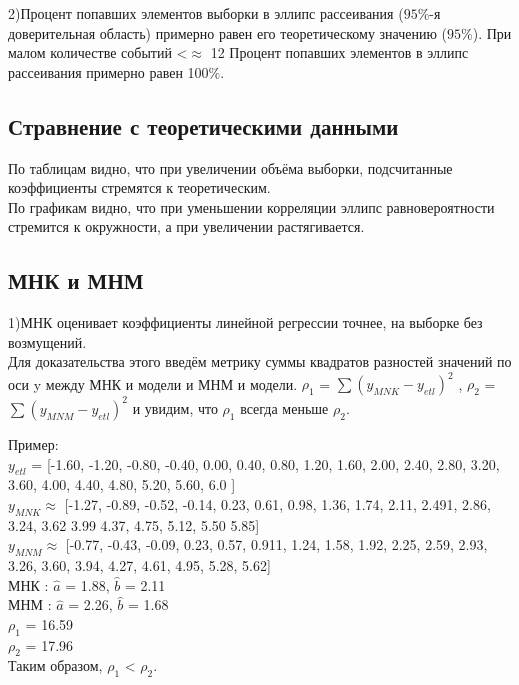 \documentclass[a4]{article}
\begin{document}
			2)Процент попавших элементов выборки в эллипс рассеивания ($95\%$-я доверительная область) примерно равен его теоретическому значению ($95\%$). При малом количестве событий <$\approx$ 12  Процент попавших элементов в эллипс рассеивания примерно равен 100$\%$.
		\subsection{Стравнение с теоретическими данными}
		По таблицам видно, что при увеличении объёма выборки, подсчитанные коэффициенты стремятся к теоретическим.\\
		По графикам видно, что при уменьшении корреляции эллипс равновероятности стремится к окружности, а при увеличении растягивается.
		\subsection{МНК и МНМ}
		1)МНК оценивает коэффициенты линейной регрессии точнее, на выборке без возмущений.\\
		Для доказательства этого введём метрику суммы квадратов разностей значений по оси y между МНК и модели и МНМ и модели. $\rho_1$ = $\sum (y_{MNK} - y_{etl})^2$ , $\rho_2$ = $\sum (y_{MNM} - y_{etl})^2$ и увидим, что $\rho_1$ всегда меньше $\rho_2$.\\ 
		\begin{center}
			Пример: \\
			$y_{etl}$ = [-1.60, -1.20, -0.80, -0.40,  0.00,   0.40,  0.80, 1.20,  1.60,  2.00,   2.40,  2.80,  3.20,  3.60, 4.00,  4.40,  4.80,  5.20,  5.60,  6.0 ]\\
			$y_{MNK} \approx $ [-1.27, -0.89, -0.52,  -0.14,  0.23,  0.61, 0.98,  1.36,  1.74,  2.11,  2.491,  2.86, 3.24,  3.62  3.99   4.37,  4.75, 5.12, 5.50  5.85]\\
			$y_{MNM} \approx$ [-0.77, -0.43, -0.09,  0.23,  0.57,  0.911,  1.24,  1.58,  1.92,  2.25,  2.59,  2.93,  3.26,  3.60,  3.94,  4.27,  4.61,  4.95,  5.28,  5.62]\\
			
			МНК : $\hat{a}$ = 1.88, $\hat{b}$ = 2.11\\
			МНМ : $\hat{a}$ = 2.26, $\hat{b}$ = 1.68\\
			
			$\rho_1$ = 16.59\\
			$\rho_2$ = 17.96\\
			
			Таким образом, $\rho_1$ < $\rho_2$.
		\end{center}
		
\end{document}
